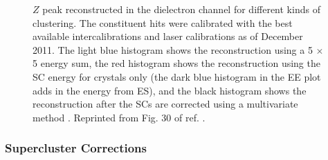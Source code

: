\documentclass[dissertation.tex]{subfiles}
\begin{document}
\begin{figure}
	\caption{$Z$ peak reconstructed in the dielectron channel for different kinds of clustering.  The constituent hits were calibrated with the best available intercalibrations and laser calibrations as of December 2011.  The light blue histogram shows the reconstruction using a 5 $\times$ 5 energy sum, the red histogram shows the reconstruction using the SC energy for crystals only (the dark blue histogram in the EE plot adds in the energy from ES), and the black histogram shows the reconstruction after the SCs are corrected using a multivariate method \cite{Higgs_note}.  Reprinted from Fig. 30 of ref. \cite{Higgs_note}.}
	\label{fig:Z_mass_vs_corrections}
\end{figure}

\subsubsection{Supercluster Corrections}
\label{sec:Supercluster Corrections}
\end{document}

